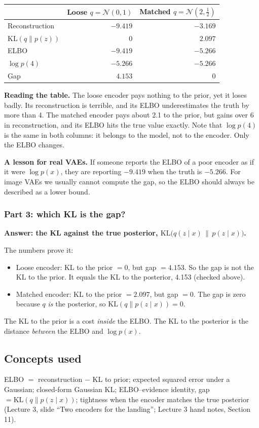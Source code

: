 \documentclass[12pt,a4paper]{article}
\begin{document}
\begin{center}
\begin{tabular}{lrr}
\toprule
 & Loose $q = \mathcal{N}(0,1)$ & Matched $q = \mathcal{N}(2,\tfrac12)$ \\
\midrule
Reconstruction & $-9.419$ & $-3.169$ \\
$\mathrm{KL}(q\|p(z))$ & $0$ & $2.097$ \\
ELBO & $-9.419$ & $-5.266$ \\
$\log p(4)$ & $-5.266$ & $-5.266$ \\
Gap & $4.153$ & $0$ \\
\bottomrule
\end{tabular}
\end{center}

\textbf{Reading the table.} The loose encoder pays nothing to the prior, yet it loses badly. Its reconstruction is terrible, and its ELBO underestimates the truth by more than 4. The matched encoder pays about 2.1 to the prior, but gains over 6 in reconstruction, and its ELBO hits the true value exactly. Note that $\log p(4)$ is the same in both columns: it belongs to the model, not to the encoder. Only the ELBO changes.

\textbf{A lesson for real VAEs.} If someone reports the ELBO of a poor encoder as if it were $\log p(x)$, they are reporting $-9.419$ when the truth is $-5.266$. For image VAEs we usually cannot compute the gap, so the ELBO should always be described as a lower bound.

\subsubsection{Part 3: which KL is the gap?}

\textbf{Answer: the KL against the true posterior, $\mathrm{KL}\big(q(z \mid x)\,\|\,p(z \mid x)\big)$.}

The numbers prove it:
\begin{itemize}[leftmargin=*]
\item Loose encoder: KL to the prior $= 0$, but gap $= 4.153$. So the gap is not the KL to the prior. It equals the KL to the posterior, 4.153 (checked above).
\item Matched encoder: KL to the prior $= 2.097$, but gap $= 0$. The gap is zero because $q$ \emph{is} the posterior, so $\mathrm{KL}(q\|p(z\mid x)) = 0$.
\end{itemize}
The KL to the prior is a cost \emph{inside} the ELBO. The KL to the posterior is the distance \emph{between} the ELBO and $\log p(x)$.

\subsection{Concepts used}

ELBO $=$ reconstruction $-$ KL to prior; expected squared error under a Gaussian; closed-form Gaussian KL; ELBO--evidence identity, gap $= \mathrm{KL}(q\|p(z\mid x))$; tightness when the encoder matches the true posterior (Lecture 3, slide ``Two encoders for the landing''; Lecture 3 hand notes, Section 11).
\end{document}
